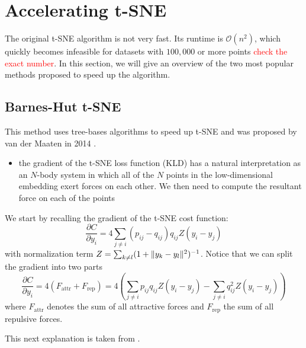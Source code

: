\section{Accelerating t-SNE}

The original t-SNE algorithm is not very fast. Its runtime is $\mathcal{O}(n^2)$, which quickly becomes infeasible for datasets with $100,000$ or more points \textcolor{red}{check the exact number}. In this section, we will give an overview of the two most popular methods proposed to speed up the algorithm. 

\subsection{Barnes-Hut t-SNE}
This method uses tree-bases algorithms to speed up t-SNE and was proposed by van der Maaten in 2014 \cite{vdMaa14}. 

\begin{itemize}
    \item the gradient of the t-SNE loss function (KLD) has a natural interpretation as an $N$-body system in which all of the $N$ points in the low-dimensional embedding exert forces on each other. We then need to compute the resultant force on each of the points
\end{itemize}
We start by recalling the gradient of the t-SNE cost function: 
\begin{equation}
    \frac{\partial C}{\partial y_i} = 4 \sum_{j \neq i} (p_{ij} - q_{ij}) q_{ij} Z (y_i - y_j)
\end{equation}
with normalization term $Z = \sum_{k \neq l} (1+ \lVert y_k - y_l\rVert^2 )^{-1}$. Notice that we can split the gradient into two parts 
\begin{equation}
    \frac{\partial C}{\partial y_i} = 4 (F_{\text{attr}} + F_{\text{rep}}) = 4 \left( \sum_{j \neq i } p_{ij} q_{ij} Z (y_i - y_j) - \sum_{j \neq i} q_{ij}^2 Z (y_i - y_j) \right) 
\end{equation}
where $F_{\text{attr}}$ denotes the sum of all attractive forces and $F_{\text{rep}}$ the sum of all repulsive forces. 

This next explanation is taken from \cite{LinStei22}. 

